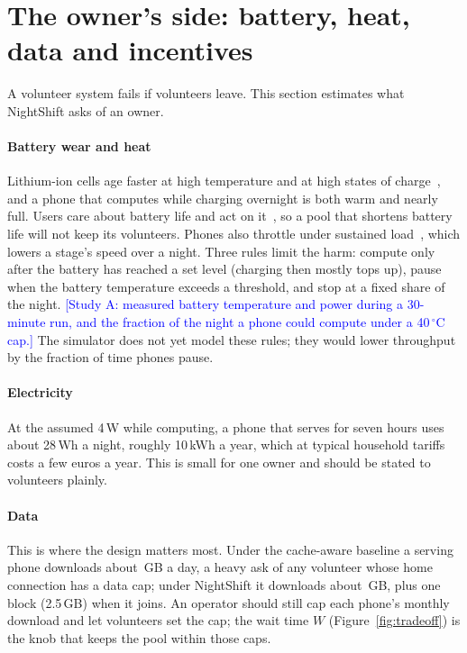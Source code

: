 \documentclass[preprint,review,12pt,authoryear]{elsarticle}
\newcommand{\Pending}[1]{\textcolor{blue}{[#1]}}
\begin{document}
\section{The owner's side: battery, heat, data and incentives}
\label{sec:owners}

A volunteer system fails if volunteers leave. This section estimates what
NightShift asks of an owner.

\paragraph{Battery wear and heat} Lithium-ion cells age faster at high
temperature and at high states of charge~\citep{vetter2005}, and a phone that
computes while charging overnight is both warm and nearly full. Users care
about battery life and act on it~\citep{ferreira2011,banerjee2007}, so a pool
that shortens battery life will not keep its volunteers. Phones also throttle
under sustained load~\citep{phonethermal}, which lowers a stage's speed over a
night. Three rules limit the harm: compute only after the battery has reached
a set level (charging then mostly tops up), pause when the battery
temperature exceeds a threshold, and stop at a fixed share of the night.
\Pending{Study A: measured battery temperature and power during a 30-minute
run, and the fraction of the night a phone could compute under a 40\,$^\circ$C
cap.} The simulator does not yet model these rules; they would lower
throughput by the fraction of time phones pause.

\paragraph{Electricity} At the assumed 4\,W while computing, a phone that
serves for seven hours uses about 28\,Wh a night, roughly 10\,kWh a year,
which at typical household tariffs costs a few euros a year. This is small for
one owner and should be stated to volunteers plainly.

\paragraph{Data} This is where the design matters most. Under the cache-aware
baseline a serving phone downloads about \PhoneGBCA\,GB a day, a heavy ask of
any volunteer whose home connection has a data cap; under
NightShift it downloads about \PhoneGBNS\,GB, plus one block (2.5\,GB) when it
joins. An operator should still cap each phone's monthly download and let
volunteers set the cap; the wait time $W$ (Figure~\ref{fig:tradeoff}) is the
knob that keeps the pool within those caps.
\end{document}
